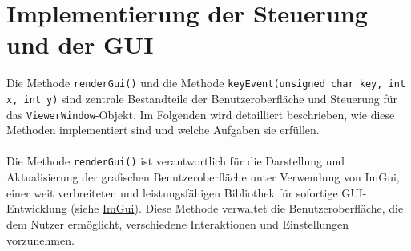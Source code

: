 \chapter{Implementierung der Steuerung und der GUI}

Die Methode \lstinline{renderGui()} und die Methode \lstinline{keyEvent(unsigned char key, int x, int y)} 
sind zentrale Bestandteile der Benutzeroberfläche und Steuerung für das
\lstinline{ViewerWindow}-Objekt. Im Folgenden wird detailliert beschrieben, wie diese
Methoden implementiert sind und welche Aufgaben sie erfüllen.
\\
\\
Die Methode \lstinline{renderGui()} ist verantwortlich für die Darstellung und
Aktualisierung der grafischen Benutzeroberfläche unter Verwendung von
ImGui, einer weit verbreiteten und leistungsfähigen Bibliothek für sofortige
GUI-Entwicklung (siehe \href{https://github.com/ocornut/imgui}{ImGui}). Diese Methode verwaltet die Benutzeroberfläche,
die dem Nutzer ermöglicht, verschiedene Interaktionen und Einstellungen
vorzunehmen.
\\
